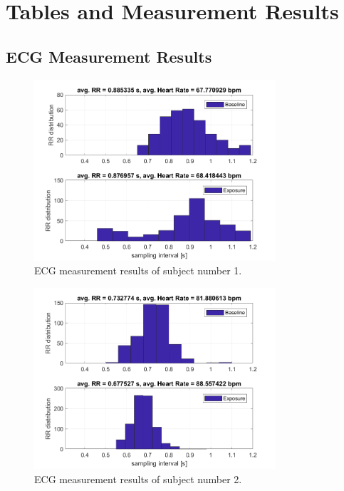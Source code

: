 

\chapter{Tables and Measurement Results}

\section{ECG Measurement Results}

\begin{figure}[H]
\centering
\includegraphics[width=0.8\textwidth]{images/1ECG.png}
\caption{ECG measurement results of subject number 1.}
\label{EDAtabImg}
\end{figure}

\begin{figure}[H]
\centering
\includegraphics[width=0.8\textwidth]{images/2ECG.png}
\caption{ECG measurement results of subject number 2.}
\label{EDAtabImg}
\end{figure}

